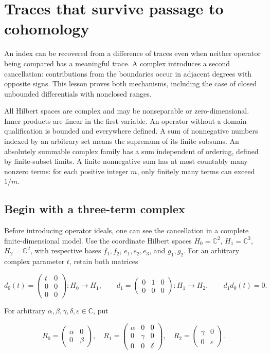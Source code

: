 \documentclass[
  11pt,
]{article}
\author{}
\date{}
\begin{document}
\section{Traces that survive passage to
cohomology}\label{traces-that-survive-passage-to-cohomology}

An index can be recovered from a difference of traces even when neither
operator being compared has a meaningful trace. A complex introduces a
second cancellation: contributions from the boundaries occur in adjacent
degrees with opposite signs. This lesson proves both mechanisms,
including the case of closed unbounded differentials with nonclosed
ranges.

All Hilbert spaces are complex and may be nonseparable or
zero-dimensional. Inner products are linear in the first variable. An
operator without a domain qualification is bounded and everywhere
defined. A sum of nonnegative numbers indexed by an arbitrary set means
the supremum of its finite subsums. An absolutely summable complex
family has a sum independent of ordering, defined by finite-subset
limits. A finite nonnegative sum has at most countably many nonzero
terms: for each positive integer \(m\), only finitely many terms can
exceed \(1/m\).

\subsection{Begin with a three-term
complex}\label{AN03-TRC-THREE-TERM-MODEL}

Before introducing operator ideals, one can see the cancellation in a
complete finite-dimensional model. Use the coordinate Hilbert spaces
\(H_0=\mathbb C^2\), \(H_1=\mathbb C^3\), \(H_2=\mathbb C^2\), with
respective bases \(f_1,f_2\), \(e_1,e_2,e_3\), and \(g_1,g_2\). For an
arbitrary complex parameter \(t\), retain both matrices

\[
 d_0(t)=\begin{pmatrix}t&0\\0&0\\0&0\end{pmatrix}:H_0\to H_1,
 \qquad
 d_1=\begin{pmatrix}0&1&0\\0&0&0\end{pmatrix}:H_1\to H_2,
 \qquad d_1d_0(t)=0.                                             \tag{T50}
\]

For arbitrary \(\alpha,\beta,\gamma,\delta,\varepsilon\in\mathbb C\),
put

\[
 R_0=\begin{pmatrix}\alpha&0\\0&\beta\end{pmatrix},\quad
 R_1=\begin{pmatrix}\alpha&0&0\\0&\gamma&0\\0&0&\delta\end{pmatrix},
 \quad
 R_2=\begin{pmatrix}\gamma&0\\0&\varepsilon\end{pmatrix}.            \tag{T51}
\]
\end{document}
